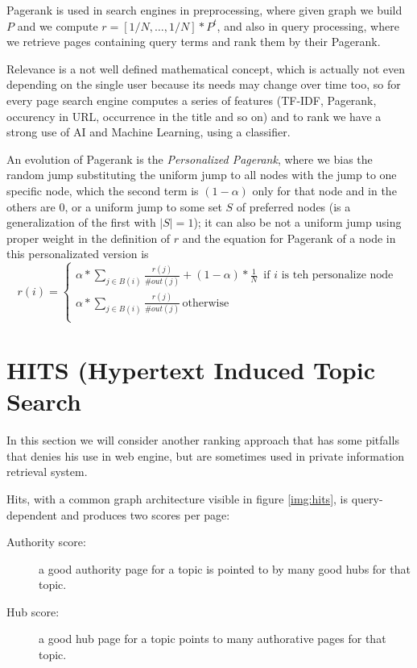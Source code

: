 Pagerank is used in search engines in preprocessing, where given graph we
build $P$ and we compute $r = [1/N, \dots, 1/N] * P^t$, and also in 
query processing, where we retrieve pages containing query terms and 
rank them by their Pagerank.

Relevance is a not well defined mathematical concept, which is actually not 
even depending on the single user because its needs may change over time too,
so for every page search engine computes a series of features (TF-IDF, Pagerank,
occurency in URL, occurrence in the title and so on) and to rank we have
a strong use of AI and Machine Learning, using a classifier.

An evolution of Pagerank is the \emph{Personalized Pagerank}, where we bias
the random jump substituting the uniform jump to all nodes with the jump to
one specific node, which the second term is $(1 - \alpha)$ only for that node
and in the others are $0$, or a uniform jump to some set $S$ of preferred
nodes (is a generalization of the first with $|S| = 1$); it can also be 
not a uniform jump using proper weight in the definition of $r$ and the 
equation for Pagerank of a node in this personalizated version is 
\[ r(i) = \begin{cases}
	\alpha * \sum _{j \in B(i)} \frac{r(j)}{\# out(j)} + (1 - \alpha) * \frac{1}{N} \, \text{ if } i \text{ is teh personalize node } \\
	\alpha * \sum _{j \in B(i)} \frac{r(j)}{\# out(j)} \, \text{otherwise} \\
	  \end{cases} \]

\section{HITS (Hypertext Induced Topic Search}
In this section we will consider another ranking approach that has some 
pitfalls that denies his use in web engine, but are sometimes used in 
private information retrieval system.

Hits, with a common graph architecture visible in figure \ref{img:hits},
is query-dependent and produces two scores per page:
\begin{description}
    \item [Authority score:] a good authority page for a topic is pointed
	   to by many good hubs for that topic.
    \item [Hub score:] a good hub page for a topic points to many authorative
	    pages for that topic.
\end{description}

